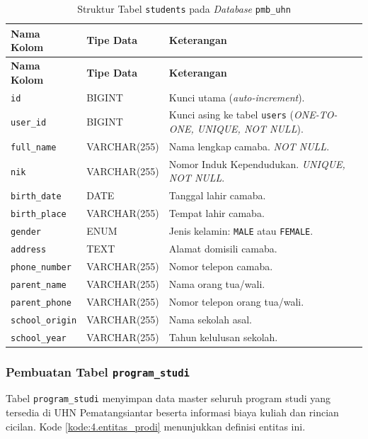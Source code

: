 \begin{longtable}{|L{0.32\textwidth}|L{0.18\textwidth}|L{0.36\textwidth}|}
	\caption{Struktur Tabel \texttt{students} pada \textit{Database} \texttt{pmb\_uhn}}
	\label{fig:4.db.students}\\
	\hline
	\textbf{Nama Kolom} & \textbf{Tipe Data} & \textbf{Keterangan} \\
	\hline
	\endfirsthead
	\hline
	\textbf{Nama Kolom} & \textbf{Tipe Data} & \textbf{Keterangan} \\
	\hline
	\endhead
	\texttt{id} & BIGINT & Kunci utama (\textit{auto-increment}). \\
	\hline
	\texttt{user\_id} & BIGINT & Kunci asing ke tabel \texttt{users} (\textit{ONE-TO-ONE, UNIQUE, NOT NULL}). \\
	\hline
	\texttt{full\_name} & VARCHAR(255) & Nama lengkap camaba. \textit{NOT NULL}. \\
	\hline
	\texttt{nik} & VARCHAR(255) & Nomor Induk Kependudukan. \textit{UNIQUE, NOT NULL}. \\
	\hline
	\texttt{birth\_date} & DATE & Tanggal lahir camaba. \\
	\hline
	\texttt{birth\_place} & VARCHAR(255) & Tempat lahir camaba. \\
	\hline
	\texttt{gender} & ENUM & Jenis kelamin: \texttt{MALE} atau \texttt{FEMALE}. \\
	\hline
	\texttt{address} & TEXT & Alamat domisili camaba. \\
	\hline
	\texttt{phone\_number} & VARCHAR(255) & Nomor telepon camaba. \\
	\hline
	\texttt{parent\_name} & VARCHAR(255) & Nama orang tua/wali. \\
	\hline
	\texttt{parent\_phone} & VARCHAR(255) & Nomor telepon orang tua/wali. \\
	\hline
	\texttt{school\_origin} & VARCHAR(255) & Nama sekolah asal. \\
	\hline
	\texttt{school\_year} & VARCHAR(255) & Tahun kelulusan sekolah. \\
	\hline
\end{longtable}

\subsubsection{Pembuatan Tabel \texttt{program\_studi}} \label{IV.DB.ProgramStudi}

Tabel \texttt{program\_studi} menyimpan data master seluruh program studi yang tersedia di UHN Pematangsiantar beserta informasi biaya kuliah dan rincian cicilan. Kode \ref{kode:4.entitas_prodi} menunjukkan definisi entitas ini.\par

